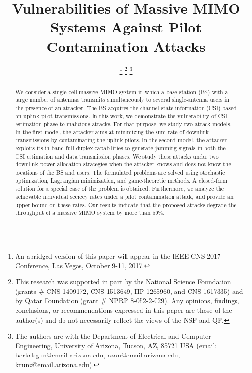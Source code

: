 \documentclass[draftclsnofoot, 12pt, onecolumn, journal]{IEEEtran}
\begin{document}
%
\title{Vulnerabilities of Massive MIMO Systems Against Pilot Contamination Attacks}

\author{
\thanks{An abridged version of this paper will appear in the IEEE CNS 2017 Conference, Las Vegas, October 9-11, 2017.}
\thanks{This research was supported in part by the National Science Foundation (grants $\#$ CNS-1409172, CNS-1513649, IIP-1265960, and CNS-1617335) and by Qatar Foundation (grant $\#$ NPRP 8-052-2-029). Any opinions, findings, conclusions, or recommendations expressed in this paper are those of the author(s) and do not necessarily reflect the views of the NSF and QF.}
\thanks{The authors are with the Department
of Electrical and Computer Engineering, University of Arizona, Tucson,
AZ, 85721 USA
(email: berkakgun@email.arizona.edu, ozan@email.arizona.edu, krunz@email.arizona.edu).}
}


\maketitle
\thispagestyle{empty}
\pagestyle{empty}


\begin{abstract}
We consider a single-cell massive MIMO system in which a base station (BS) with a large number of antennas transmits simultaneously to several single-antenna users in the presence of an attacker. The BS acquires the channel state information (CSI) based on uplink pilot transmissions. In this work, we demonstrate the vulnerability of CSI estimation phase to malicious attacks. For that purpose, we study two attack models. In the first model, the attacker aims at minimizing the sum-rate of downlink transmissions by contaminating the uplink pilots. In the second model, the attacker exploits its in-band full-duplex capabilities to generate jamming signals in both the CSI estimation and data transmission phases. We study these attacks under two downlink power allocation strategies when the attacker knows and does not know the locations of the BS and users. The formulated problems are solved using stochastic optimization, Lagrangian minimization, and game-theoretic methods. A closed-form solution for a special case of the problem is obtained. Furthermore, we analyze the achievable individual secrecy rates under a pilot contamination attack, and provide an upper bound on these rates. Our results indicate that the proposed attacks degrade the throughput of a massive MIMO system by more than $50\%$.
\end{abstract}
\end{document}
